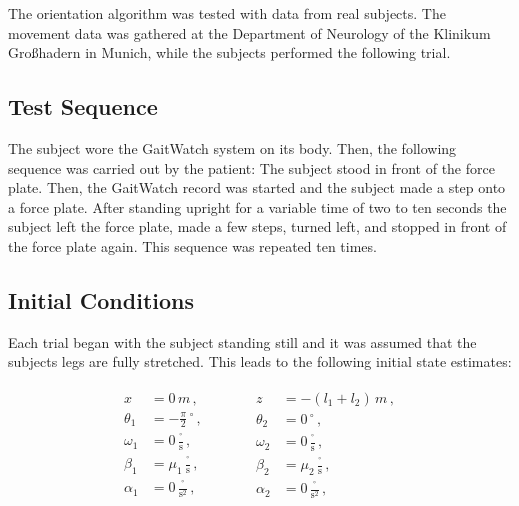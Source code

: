 The orientation algorithm was tested with data from real subjects. The movement data was gathered at the Department of Neurology of the Klinikum Großhadern in Munich, while the subjects performed the following trial.

\subsection{Test Sequence}

The subject wore the GaitWatch system on its body. Then, the following sequence was carried out by the patient: The subject stood in front of the force plate. Then, the GaitWatch record was started and the subject made a step onto a force plate. After standing upright for a variable time of two to ten seconds the subject left the force plate, made a few steps, turned left, and stopped in front of the force plate again. This sequence was repeated ten times.

\subsection{Initial Conditions}

Each trial began with the subject standing still and it was assumed that the subjects legs are fully stretched. This leads to the following initial state estimates:

\begin{equation}
\begin{matrix}
	\begin{split}
	  x &= 0\,m\,, \\
	  \theta_1 &= -\frac{\pi}{2}\,^{\circ}\,, \\
	  \omega_1 &= 0\,\frac{^{\circ}}{\mbox{s}}\,, \\
	  \beta_1 &= \mu_1\,\frac{^{\circ}}{\mbox{s}}\,, \\
	  \alpha_1 &= 0\,\frac{^{\circ}}{\mbox{s}^2}\,,
\end{split} \qquad \quad
    \begin{split}
   	  z &= -(l_1+l_2)\,m\,, \\
	  \theta_2 &= 0\,^{\circ}\,, \mathrel{\phantom{\frac{\pi}{2}}}\\
	  \omega_2 &= 0\,\frac{^{\circ}}{\mbox{s}}\,, \\
	  \beta_2 &= \mu_2\,\frac{^{\circ}}{\mbox{s}}\,, \\
	  \alpha_2 &= 0\,\frac{^{\circ}}{\mbox{s}^2}\,,  
\end{split}
\end{matrix}
\end{equation}

